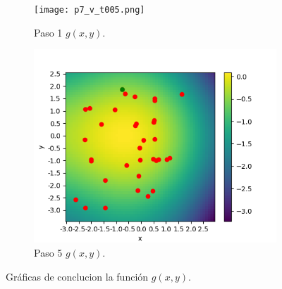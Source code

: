 \documentclass{article}
\begin{document}
\begin{figure} [h!]
 	\centering
 	\begin{subfigure}[b]{0.45\linewidth}
 		\texttt{[image: p7\_v\_t005.png]}
 		 \caption{Paso 1 $g(x,y)$.}
 		\label{3d}
 	\end{subfigure}
 	\begin{subfigure}[b]{0.45\linewidth}
 		\includegraphics[width=\linewidth]{p7_v_t04.png}
 		 \caption{Paso 5 $g(x,y)$.}
 		\label{levelplot}
 	\end{subfigure}
 	\caption{Gráficas de conclucion la función $g(x,y)$.}
 	\label{con}
 \end{figure}



\end{document}
